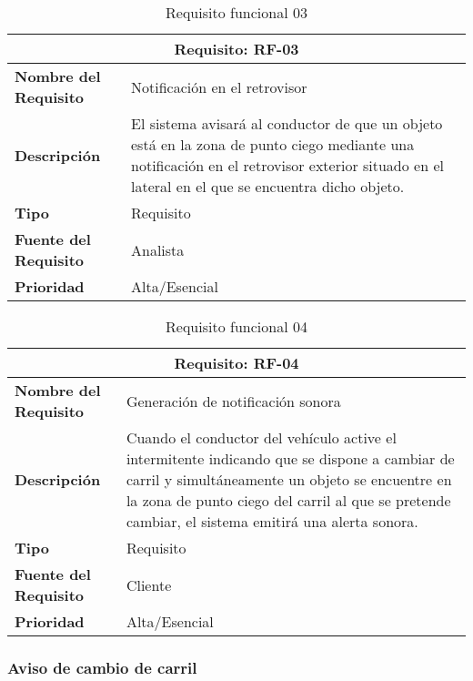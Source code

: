 \begin{table}[H]
\begin{center}
\begin{tabular}{p{} p{7cm}}
\multicolumn{2}{c}{\textbf{Requisito: RF-03} } \\
\hline \hline
\textbf{Nombre del Requisito} & Notificación en el retrovisor \\
\hline
\textbf{Descripción} & El sistema avisará al conductor de que un objeto está en la zona de punto ciego mediante una notificación en el retrovisor exterior situado en el lateral en el que se encuentra dicho objeto.\\
\hline
\textbf{Tipo} & Requisito  \\
\hline
\textbf{Fuente del Requisito} & Analista  \\
\hline
\textbf{Prioridad} & Alta/Esencial  \\ \hline
\end{tabular}
\caption{Requisito funcional 03}
\label{tab:RF-03}
\end{center}
\end{table}

\begin{table}[H]
\begin{center}
\begin{tabular}{p{} p{7cm}}
\multicolumn{2}{c}{\textbf{Requisito: RF-04} } \\
\hline \hline
\textbf{Nombre del Requisito} & Generación de notificación sonora \\
\hline
\textbf{Descripción} &  Cuando el conductor del vehículo active el intermitente indicando que se dispone a cambiar de carril y simultáneamente un objeto se encuentre en la zona de punto ciego del carril al que se pretende cambiar, el sistema emitirá una alerta sonora. \\
\hline
\textbf{Tipo} & Requisito  \\
\hline
\textbf{Fuente del Requisito} & Cliente  \\
\hline
\textbf{Prioridad} & Alta/Esencial  \\ \hline
\end{tabular}
\caption{Requisito funcional 04}
\label{tab:RF-04}
\end{center}
\end{table}


\subsubsection{Aviso de cambio de carril}


